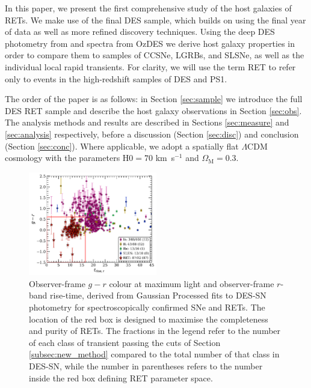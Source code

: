 \documentclass[fleqn,usenatbib,]{mnras}
\newcommand{\replychris}[1]{\color{magenta}#1 \color{black}}
\begin{document}
In this paper, we present the first comprehensive study of the host galaxies of RETs. We make use of the final DES sample, which builds on \citet{Pursiainen2018} using the final year of data as well as more refined discovery techniques. Using the deep DES photometry from \citet{Wiseman2020} and spectra from OzDES \citep{Lidman2020} we derive host galaxy properties in order to compare them to samples of CCSNe, LGRBs, and SLSNe, as well as the individual local rapid transients. For clarity, we will use the term RET to refer only to events in the high-redshift samples of DES and PS1. 

The order of the paper is as follows: \replychris{in Section \ref{sec:sample} we introduce the full DES RET sample and describe the host galaxy observations in Section \ref{sec:obs}. The analysis methods and results are described in Sections \ref{sec:measure} and \ref{sec:analysis} respectively, before a discussion (Section \ref{sec:disc}) and conclusion (Section \ref{sec:conc}).}
Where applicable, we adopt a spatially flat $\Lambda$CDM cosmology with the parameters H$0=70$ km~s$^{-1}$ and $\Omega_{\textrm{M}}=0.3$.

\begin{figure}
\includegraphics[width=0.5\textwidth]{figs/spec_gr_trise_r_GP5_new_colorscheme.pdf}
\caption{Observer-frame $g-r$ colour \replychris{at maximum light} and \replychris{observer-frame} $r$-band rise-time, derived from Gaussian Processed fits to DES-SN photometry for spectroscopically confirmed SNe and  RETs. The location of the red box is designed to maximise the completeness and purity of RETs. \replychris{ The fractions in the legend refer to the number of each class of transient passing the cuts of Section \ref{subsec:new_method} compared to the total number of that class in DES-SN, while the number in parentheses refers to the number inside the red box defining RET parameter space. }
\label{fig:selection}}
\end{figure}
\end{document}

